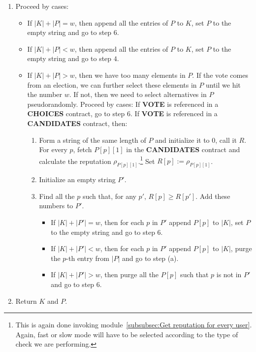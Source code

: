 \documentclass[submission, copyright,creativecommons,sharealike,noncommercial]{eptcs}
\newcommand{\Candidates}{\textbf{CANDIDATES}\xspace}
\newcommand{\Choices}{\textbf{CHOICES}\xspace}
\newcommand{\Vote}{\textbf{VOTE}\xspace}
\begin{document}
\begin{enumerate}
		\item Proceed by cases:
		\begin{itemize}
			\item If $|K|+|P| = w$, then append all the entries of $P$ to $K$, set $P$ to the empty string and go to step $6$.
			\item If $|K|+|P| < w$, then append all the entries of $P$ to $K$, set $P$ to the empty string and go to step $4$. 
			\item If $|K|+|P| > w$, then we have too many elements in $P$. If the vote comes from an election, we can further select these elements in $P$ until we hit the number $w$. If not, then we need to select alternatives in $P$ pseudorandomly. Proceed by cases: If \Vote is referenced in a \Choices contract, go to step $6$. If \Vote is referenced in a \Candidates contract, then:
			\begin{enumerate}
				\item Form a string of the same length of $P$ and initialize it to $0$, call it $R$. For every $p$, fetch $P[p][1]$  in the \Candidates contract and calculate the reputation $\rho_{P[p][1]}$.\footnote{This is again done invoking module~\ref{subsubsec:Get reputation for every user}. Again, fast or slow mode will have to be selected according to the type of check we are performing.} Set $R[p] := \rho_{P[p][1]}$.
				\item Initialize an empty string $P'$.
				\item Find all the $p$ such that, for any $p'$, $R[p] \geq R[p']$. Add these numbers to $P'$.
				\begin{itemize}
					\item If $|K| + |P'| = w$, then for each $p$ in $P'$ append $P[p]$ to $|K|$, set $P$ to the empty string and go to step $6$.
					\item If $|K| + |P'| < w$, then for each $p$ in $P'$ append $P[p]$ to $|K|$, purge the $p$-th entry from $|P|$ and go to step (a).
					\item If $|K| + |P'| > w$, then purge all the $P[p]$ such that $p$ is not in $P'$ and go to step $6$.
				\end{itemize}
			\end{enumerate}
		\end{itemize}
		
		\item Return $K$ and $P$.
		
	\end{enumerate}
\end{document}
